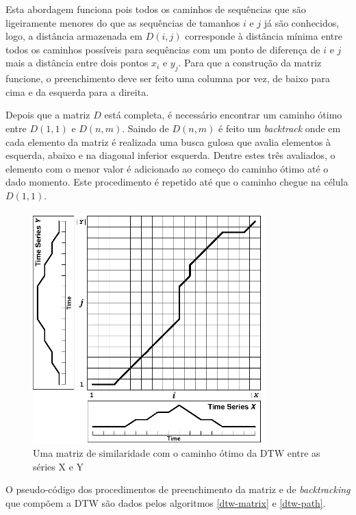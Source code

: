 Esta abordagem funciona pois todos os caminhos de sequências que são ligeiramente menores do que as sequências de tamanhos $i$ e $j$ já são conhecidos, logo, a distância armazenada em $D(i, j)$ corresponde à distância mínima entre todos os caminhos possíveis para sequências com um ponto de diferença de $i$ e $j$ mais a distância entre dois pontos $x_i$ e $y_j$. Para que a construção da matriz funcione, o preenchimento deve ser feito uma columna por vez, de baixo para cima e da esquerda para a direita. 

Depois que a matriz $D$ está completa, é necessário encontrar um caminho ótimo entre $D(1, 1)$ e $D(n, m)$. Saindo de $D(n, m)$ é feito um \textit{backtrack} onde em cada elemento da matriz é realizada uma busca gulosa que avalia elementos à esquerda, abaixo e na diagonal inferior esquerda. Dentre estes três avaliados, o elemento com o menor valor é adicionado ao começo do caminho ótimo até o dado momento. Este procedimento é repetido até que o caminho chegue na célula $D(1, 1)$.

\begin{figure}[htb]
\centering
\includegraphics[width=9cm]{figuras/dtw_warp_path.png}
\caption{Uma matriz de similaridade com o caminho ótimo da DTW entre as séries X e Y\citep{salvador2007toward}}
\label{fig:dtw-matrix-and-path}
\end{figure}

O pseudo-código dos procedimentos de preenchimento da matriz \citep{hierarchical-time-clustering} e de \textit{backtracking} que compõem a DTW são dados pelos algoritmos \ref{dtw-matrix} e \ref{dtw-path}.



